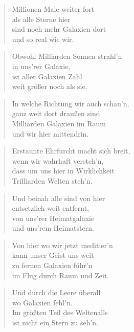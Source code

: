 \documentclass[10pt,a4paper]{article}
\begin{document}
\begin{paracol}{2}
\begin{verse}
Millionen Male weiter fort \\
als alle Sterne hier \\
sind noch mehr Galaxien dort \\
und so real wie wir. \\
\end{verse}

\begin{verse}
Obwohl Milliarden Sonnen strahl’n \\
in uns’rer Galaxie, \\
ist aller Galaxien Zahl \\
weit größer noch als sie. \\
\end{verse}

\begin{verse}
In welche Richtung wir auch schau’n, \\
ganz weit dort draußen sind \\
Milliarden Galaxien im Raum \\
und wir hier mittendrin. \\
\end{verse}

\begin{verse}
Erstaunte Ehrfurcht macht sich breit, \\
wenn wir wahrhaft versteh’n, \\
dass um uns hier in Wirklichkeit \\
Trilliarden Welten steh’n. \\
\end{verse}

\begin{verse}
Und beinah alle sind von hier \\
entsetzlich weit entfernt, \\
von uns’rer Heimatgalaxie \\
und uns’rem Heimatstern. \\
\end{verse}

\begin{verse}
Von hier wo wir jetzt meditier’n \\
kann unser Geist uns weit \\
zu fernen Galaxien führ’n \\
im Flug durch Raum und Zeit. \\
\end{verse}

\begin{verse}
Und durch die Leere überall \\
wo Galaxien fehl’n. \\
Im größten Teil des Weltenalls \\
ist nicht ein Stern zu seh’n. \\
\end{verse}


\end{paracol}
\end{document}
